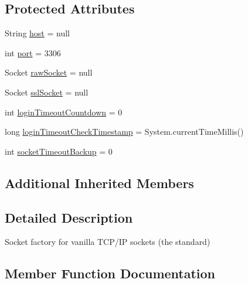 \subsection*{Protected Attributes}
\begin{DoxyCompactItemize}
\item 
String \mbox{\hyperlink{classcom_1_1mysql_1_1cj_1_1protocol_1_1_standard_socket_factory_a61a6781433c3290f82de3629497c74c5}{host}} = null
\item 
int \mbox{\hyperlink{classcom_1_1mysql_1_1cj_1_1protocol_1_1_standard_socket_factory_ae354b398ef8c4ffc1772d3ff0d5c671a}{port}} = 3306
\item 
Socket \mbox{\hyperlink{classcom_1_1mysql_1_1cj_1_1protocol_1_1_standard_socket_factory_ae74434dafb7028bd70980bd3c648c170}{raw\+Socket}} = null
\item 
Socket \mbox{\hyperlink{classcom_1_1mysql_1_1cj_1_1protocol_1_1_standard_socket_factory_aece3a18276dc380df45049ac5d58f731}{ssl\+Socket}} = null
\item 
int \mbox{\hyperlink{classcom_1_1mysql_1_1cj_1_1protocol_1_1_standard_socket_factory_a71fb7fd435ce8e4b8ef9b31e9707f728}{login\+Timeout\+Countdown}} = 0
\item 
long \mbox{\hyperlink{classcom_1_1mysql_1_1cj_1_1protocol_1_1_standard_socket_factory_a443e8bc4c1aa5ffa40dd212193077cdf}{login\+Timeout\+Check\+Timestamp}} = System.\+current\+Time\+Millis()
\item 
int \mbox{\hyperlink{classcom_1_1mysql_1_1cj_1_1protocol_1_1_standard_socket_factory_a15bf8ebd7425eb36e786e8ab7c4fe10e}{socket\+Timeout\+Backup}} = 0
\end{DoxyCompactItemize}
\subsection*{Additional Inherited Members}


\subsection{Detailed Description}
Socket factory for vanilla T\+C\+P/\+IP sockets (the standard) 

\subsection{Member Function Documentation}
\mbox{\label{classcom_1_1mysql_1_1cj_1_1protocol_1_1_standard_socket_factory_a3d55f3b14d5d46d75ab93c88a339a72a}} 
